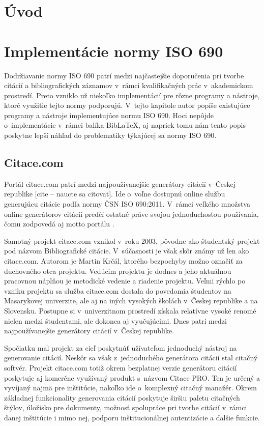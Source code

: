 \documentclass{fithesis3}
\begin{document}
\chapter{Úvod}

\chapter{Implementácie normy ISO 690}
Dodržiavanie normy ISO 690 patrí medzi najčastejšie doporučenia pri tvorbe citácií a bibliografických záznamov v~rámci kvalifikačných prác v~akademickom prostredí. Preto vzniklo už niekoľko implementácií pre rôzne programy a nástroje, ktoré využitie tejto normy podporujú. V~tejto kapitole autor popíše existujúce programy a nástroje implementujúce normu ISO 690. Hoci nepôjde o~implementácie v~rámci balíka Bib\LaTeX, aj napriek tomu nám tento popis poskytne lepší náhľad do problematiky týkajúcej sa normy ISO 690.

	\section{Citace.com}
	Portál citace.com patrí medzi najpoužívanejšie generátory citácií v~Českej republike [cite -- naucte sa citovat]. Ide o~voľne dostupnú online službu generujúcu citácie podľa normy ČSN ISO 690:2011. V~rámci veľkého množstva online generátorov citácií predčí ostatné práve svojou jednoduchosťou používania, čomu zodpovedá aj motto portálu .

	Samotný projekt citace.com vznikol v~roku 2003, pôvodne ako študentský projekt pod názvom Bibliografické citácie. V~súčasnosti je však skôr známy už len ako citace.com. Autorom je Martin Krčál, ktorého bezpochyby možno označiť za duchovného otca projektu. Vedúcim projektu je dodnes a jeho aktuálnou pracovnou náplňou je metodické vedenie a riadenie projektu. Veľmi rýchlo po vzniku projektu sa služba citace.com dostala do povedomia študentov na Masarykovej univerzite, ale aj na iných vysokých školách v~Českej republike a na Slovensku. Postupne si v~univerzitnom prostredí získala relatívne vysoké renomé nielen medzi študentami, ale dokonca aj vyučujúcimi. Dnes patrí medzi najpoužívanejšie generátory citácií v~Českej republike.

	Spočiatku mal projekt za cieľ poskytnúť užívateľom jednoduchý nástroj na generovanie citácií. Neskôr sa však z~jednoduchého generátora citácií stal citačný softvér. Projekt citace.com totiž okrem bezplatnej verzie generátoru citácií poskytuje aj komerčne využívaný produkt s~názvom Citace PRO. Ten je určený a vyvíjaný najmä pre inštitúcie, nakoľko ide o~komplexný citačný manažér. Okrem základnej funkcionality generovania citácií poskytuje širšiu paletu citačných štýlov, úložisko pre dokumenty, možnosť spolupráce pri tvorbe citácií v~rámci danej inštitúcie i mimo nej, podporu inštitucionálnej autentizácie a ďalšie funkcie.
\end{document}
